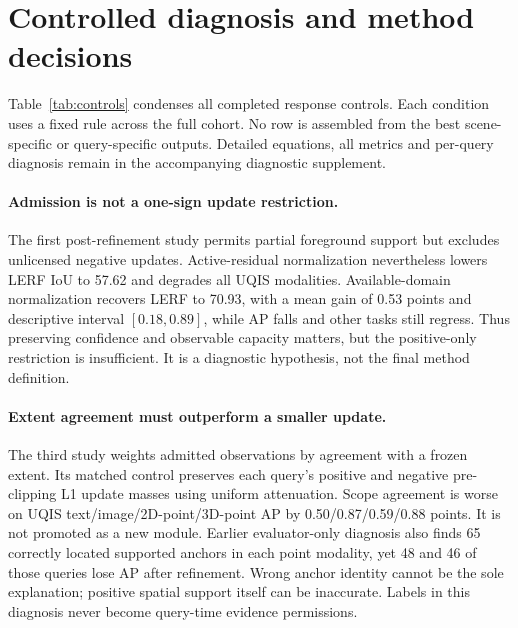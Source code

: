\documentclass[10pt]{article}
\begin{document}
\section{Controlled diagnosis and method decisions}
\label{sec:stage-study}
Table~\ref{tab:controls} condenses all completed response controls. Each condition
uses a fixed rule across the full cohort. No row is assembled from the best
scene-specific or query-specific outputs. Detailed equations, all metrics and
per-query diagnosis remain in the accompanying diagnostic supplement.

\begin{table}[ht]
\centering\small
\resizebox{\linewidth}{!}{}
\caption{Complete development controls (\%). L: LERF; N: NVOS; S: ScanNet;
U: UQIS AP by query type. Post conditions act on the retained final response;
stage conditions act on frozen pre-fusion providers. $\dagger$: unchanged UQIS
compatibility output, not a reconstruction intervention. Independent selected
sets remain fixed throughout.}
\label{tab:controls}
\end{table}

\paragraph{Admission is not a one-sign update restriction.}
The first post-refinement study permits partial foreground support but excludes
unlicensed negative updates. Active-residual normalization nevertheless lowers
LERF IoU to 57.62 and degrades all UQIS modalities. Available-domain normalization
recovers LERF to 70.93, with a mean gain of 0.53 points and descriptive interval
$[0.18,0.89]$, while AP falls and other tasks still regress. Thus preserving
confidence and observable capacity matters, but the positive-only restriction
is insufficient. It is a diagnostic hypothesis, not the final method definition.

\paragraph{Extent agreement must outperform a smaller update.}
The third study weights admitted observations by agreement with a frozen extent.
Its matched control preserves each query's positive and negative pre-clipping
L1 update masses using uniform attenuation. Scope agreement is worse on UQIS
text/image/2D-point/3D-point AP by 0.50/0.87/0.59/0.88 points. It is not promoted
as a new module. Earlier evaluator-only diagnosis also finds 65 correctly
located supported anchors in each point modality, yet 48 and 46 of those
queries lose AP after refinement. Wrong anchor identity cannot be the sole
explanation; positive spatial support itself can be inaccurate. Labels in
this diagnosis never become query-time evidence permissions.
\end{document}
